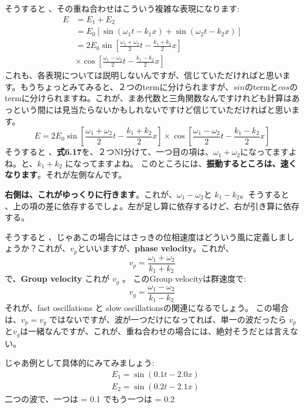 そうすると 、その重ね合わせはこういう複雑な表現になります:
\begin{equation}
\begin{aligned}
E &=E_{1}+E_{2} \\
&=E_{0}\left[\sin \left(\omega_{1} t-k_{1} x\right)+\sin \left(\omega_{2} t-k_{2} x\right)\right] \\
&=2 E_{0} \sin \left[\frac{\omega_{1}+\omega_{2}}{2} t-\frac{k_{1}+k_{2}}{2} x\right] \\
& \times \cos \left[\frac{\omega_{1}-\omega_{2}}{2} t-\frac{k_{1}-k_{2}}{2} x\right]
\end{aligned}
\end{equation}
これも、各表現については説明しないんですが、信じていただければと思います。もうちょっとみてみると、２つのtermに分けられますが、$sin$のtermと$cos$のtermに分けられますね。これが、まあ代数と三角関数なんですけれども計算はあっという間には見当たらないかもしれないですけど信じていただければと思います。
\begin{equation}
E=2 E_{0} \sin \left[\frac{\omega_{1}+\omega_{2}}{2} t-\frac{k_{1}+k_{2}}{2} x\right] \times \cos \left[\frac{\omega_{1}-\omega_{2}}{2} t-\frac{k_{1}-k_{2}}{2} x\right]
\end{equation}
そうすると 、\textbf{式6.17}を、２つNI分けて、一つ目の項は、$\omega_1 + \omega_2$になってますよね。と、$k_1 + k_2$ になってますよね。
このところには、\textbf{振動するところは、速くなります}。それが左側なんです。

\textbf{右側は、これがゆっくりに行きます}。これが、$\omega_1 - \omega_2$と $k_1 - k_2$。そうすると 、上の項の差に依存するでしょ。左が足し算に依存するけど、右が引き算に依存する。

そうすると 、じゃあこの場合にはさっきの位相速度はどういう風に定義しましょうか？これが、$v_p$といいますが、\textbf{phase velocity}。これが、
\begin{equation}
v_p = \frac{\omega_{1}+\omega_{2}}{k_{1}+k_{2}}
\end{equation}
で、\textbf{Group velocity} これが $v_g$ 。
このGroup velocityは群速度で:
\begin{equation}
v_g = \frac{\omega_{1}-\omega_{2}}{k_{1}-k_{2}}
\end{equation}
それが、fast oscillations  と slow oscillationsの関連になるでしょう。
この場合は、$v_p = v_g$ ではないですが、波が一つだけになってれば、単一の波だったら
$v_p$と$v_g$は一緒なんですが、これが、重ね合わせの場合には、絶対そうだとは言えない。

じゃあ例として具体的にみてみましょう:
\begin{equation}
\begin{aligned}
&E_{1}=\sin (0.1 t-2.0 x) \\
&E_{2}=\sin (0.2 t-2.1 x)
\end{aligned}
\end{equation}
\iffalse
二つの波で、一つは \omega = 0.1
でもう一つは \omega = 0.2 

